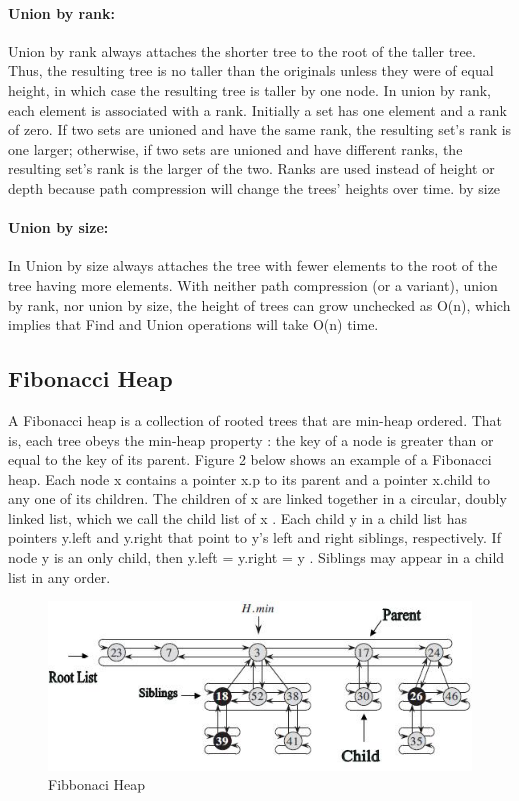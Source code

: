 \documentclass{article}
\begin{document}
\paragraph{Union by rank:}Union by rank always attaches the shorter tree to the root of the taller tree. Thus, the resulting tree is no taller than the originals unless they were of equal height, in which case the resulting tree is taller by one node. In union by rank, each element is associated with a rank. Initially a set has one element and a rank of zero. If two sets are unioned and have the same rank, the resulting set's rank is one larger; otherwise, if two sets are unioned and have different ranks, the resulting set's rank is the larger of the two. Ranks are used instead of height or depth because path compression will change the trees' heights over time.
by size
\paragraph{Union by size:}In Union by size always attaches the tree with fewer elements to the root of the tree having more elements. 
With neither path compression (or a variant), union by rank, nor union by size, the height of trees can grow unchecked as O(n), which implies that Find and Union operations will take O(n) time.

\subsection{Fibonacci Heap}
A Fibonacci heap is a collection of rooted trees that are min-heap ordered. That is, each tree obeys the min-heap property : the key of a node is greater than or equal to the key of its parent. Figure 2 below shows an example of a Fibonacci heap. Each node x contains a pointer x.p to its parent and a pointer x.child to any one of its children. The children of x are linked together in a circular, doubly linked list, which we call the child list of x . Each child y in a child list has pointers y.left and y.right that point to y’s left and right siblings, respectively.  If node y is an only child, then y.left = y.right = y . Siblings may appear in a child list in any order.

\begin{figure}[h!]
\centering
\includegraphics[width=0.9\columnwidth]{Fibbonaci.JPG}
\caption{Fibbonaci Heap}
\label{fig:fib1}
\end{figure}
\end{document}
